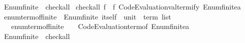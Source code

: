 \begin{isabellebody}
%
\isadelimproof
%
\endisadelimproof
\isanewline
\isanewline
{}\isamarkupfalse%
\isanewline
\isanewline
\isanewline
{}\isamarkupfalse%
\ Enum{\isachardot}{\kern0pt}finite{\isacharunderscore}{\kern0pt}{}\ {\isacharcolon}{\kern0pt}{\isacharcolon}{\kern0pt}\ check{\isacharunderscore}{\kern0pt}all\isanewline
{}\isanewline
\isanewline
{}\isamarkupfalse%
\ {\isachardoublequoteopen}check{\isacharunderscore}{\kern0pt}all\ f\ {\isacharequal}{\kern0pt}\ f\ {\isacharparenleft}{\kern0pt}Code{\isacharunderscore}{\kern0pt}Evaluation{\isachardot}{\kern0pt}valtermify\ Enum{\isachardot}{\kern0pt}finite{\isacharunderscore}{\kern0pt}{}{\isachardot}{\kern0pt}a\isanewline
\isanewline
{}\isamarkupfalse%
\ enum{\isacharunderscore}{\kern0pt}term{\isacharunderscore}{\kern0pt}of{\isacharunderscore}{\kern0pt}finite{\isacharunderscore}{\kern0pt}{}\ {\isacharcolon}{\kern0pt}{\isacharcolon}{\kern0pt}\ {\isachardoublequoteopen}Enum{\isachardot}{\kern0pt}finite{\isacharunderscore}{\kern0pt}{}\ itself\ {\isasymRightarrow}\ unit\ {\isasymRightarrow}\ term\ list{\isachardoublequoteclose}\isanewline
\ \ \ {\isachardoublequoteopen}enum{\isacharunderscore}{\kern0pt}term{\isacharunderscore}{\kern0pt}of{\isacharunderscore}{\kern0pt}finite{\isacharunderscore}{\kern0pt}{}\ {\isacharequal}{\kern0pt}\ {\isacharparenleft}{\kern0pt}{\isasymlambda}{\isacharunderscore}{\kern0pt}\ {\isacharunderscore}{\kern0pt}{\isachardot}{\kern0pt}\ {\isacharbrackleft}{\kern0pt}Code{\isacharunderscore}{\kern0pt}Evaluation{\isachardot}{\kern0pt}term{\isacharunderscore}{\kern0pt}of\ Enum{\isachardot}{\kern0pt}finite{\isacharunderscore}{\kern0pt}{}{\isachardot}{\kern0pt}a\isanewline
\isanewline
{}\isamarkupfalse%
%
\isadelimproof
\ %
\endisadelimproof
%
\isatagproof
\isacommand{{\isachardot}{\kern0pt}{\isachardot}{\kern0pt}}\isamarkupfalse%
%
\endisatagproof
{\isafoldproof}%
%
\isadelimproof
%
\endisadelimproof
\isanewline
\isanewline
{}\isamarkupfalse%
\isanewline
\isanewline
{}\isamarkupfalse%
\ Enum{\isachardot}{\kern0pt}finite{\isacharunderscore}{\kern0pt}{}\ {\isacharcolon}{\kern0pt}{\isacharcolon}{\kern0pt}\ check{\isacharunderscore}{\kern0pt}all\isanewline
{}\isanewline

\end{isabellebody}
